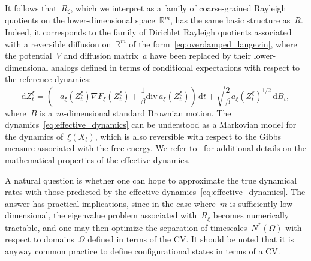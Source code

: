 \documentclass[a4]{article}
\renewcommand{\d}{\mathrm{d}}
\renewcommand{\div}{\mathrm{div}}
\newcommand{\R}{\mathbb{R}}
\newcommand{\1}{\mathbbm 1}
\begin{document}
    It follows that~$R_\xi$, which we interpret as a family of coarse-grained Rayleigh quotients on the lower-dimensional space~$\R^m$, has the same basic structure as~$R$.
    Indeed, it corresponds to the family of Dirichlet Rayleigh quotients associated with a reversible diffusion on~$\R^m$ of the form~\eqref{eq:overdamped_langevin}, where the potential~$V$ and diffusion matrix~$a$ have been replaced by their lower-dimensional analogs defined in terms of conditional expectations with respect to the reference dynamics:
    \begin{equation}
        \label{eq:effective_dynamics}
        \d Z_t^\xi = \left(-a_\xi(Z_t^\xi)\nabla F_\xi(Z^\xi_t) + \frac1\beta\div\,a_\xi(Z_t^\xi)\right)\,\d t + \sqrt{\frac{2}\beta}a_\xi(Z_t^\xi)^{1/2}\,\d B_t,
    \end{equation}
    where~$B$ is a~$m$-dimensional standard Brownian motion. The dynamics~\eqref{eq:effective_dynamics} can be understood as a Markovian model for the dynamics of~$\xi(X_t)$, which is also reversible with respect to the Gibbs measure associated with the free energy.
    We refer to~\cite{LL10,ZHS16} for additional details on the mathematical properties of the effective dynamics.

    A natural question is whether one can hope to approximate the true dynamical rates with those predicted by the effective dynamics~\eqref{eq:effective_dynamics}.
    The answer has practical implications, since in the case where~$m$ is sufficiently low-dimensional, the eigenvalue problem associated with~$R_\xi$ becomes numerically tractable, and one may then optimize the separation of timescales~$N^*(\Omega)$ with respect to domains~$\Omega$ defined in terms of the CV.
    It should be noted that it is anyway common practice to define configurational states in terms of a CV.
\end{document}

